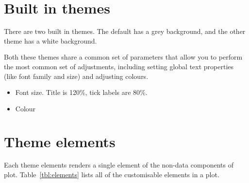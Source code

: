 \section{Built in themes}
\label{sec:built_in}

There are two built in themes.  The default has a grey background, and the other theme has a white background.

Both these themes share a common set of parameters that allow you to perform the most common set of adjustments, including setting global text properties (like font family and size) and adjusting colours.  

\begin{itemize}
  \item Font size.  Title is 120\%, tick labels are 80\%.
  \item Colour
\end{itemize}

% 

\section{Theme elements}
\label{sec:theme_elements}

Each theme elements renders a single element of the non-data components of plot.  Table~\ref{tbl:elements} lists all of the customisable elements in a plot.

